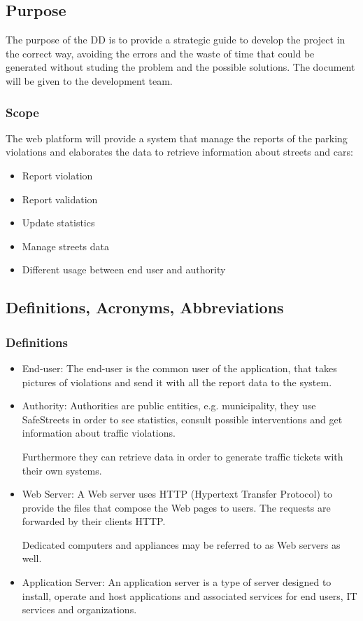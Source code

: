 \subsection{Purpose}
The purpose of the DD is to provide a strategic guide to develop the project in the correct way, avoiding the errors and the waste of time that could be generated without studing the problem and the possible solutions. 
The document will be given to the development team.

\subsubsection{Scope}
The web platform will provide a system that manage the reports of the parking violations and elaborates the data to retrieve information about streets and cars:
\begin{itemize}
	\item
	Report violation
	\item 
	Report validation
	\item
	Update statistics
	\item
	Manage streets data
	\item
	Different usage between end user and authority
\end{itemize}
\subsection{Definitions, Acronyms, Abbreviations}
\subsubsection{Definitions}
\begin{itemize}
	\item 
	End-user: The end-user is the common user of the application, that takes pictures of violations and send it with all the report data to the system.
	\item 
	Authority: Authorities are public entities, e.g. municipality, they use SafeStreets in order to see statistics, consult possible interventions and get information about traffic violations.
	
	
	Furthermore they can retrieve data in order to generate traffic tickets with their own systems.
	\item 
	Web Server: A Web server uses HTTP (Hypertext Transfer Protocol) to provide the files that compose the Web pages to users. The requests are forwarded by their clients HTTP.
	 
	Dedicated computers and appliances may be referred to as Web servers as well.
	\item 
	Application Server: An application server is a type of server designed to install, operate and host applications and associated services for end users, IT services and organizations.
\end{itemize}
